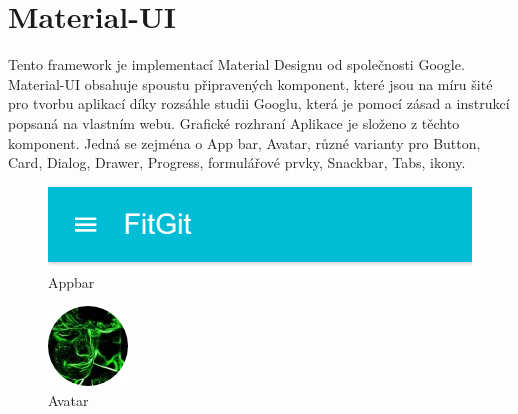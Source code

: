 \section{Material-UI}

Tento framework je implementací Material Designu od společnosti Google. Material-UI obsahuje spoustu připravených komponent, které jsou na míru šité pro tvorbu aplikací díky rozsáhle studii Googlu, která je pomocí zásad a instrukcí popsaná na vlastním webu. Grafické rozhraní Aplikace je složeno z těchto komponent. Jedná se zejména o App bar, Avatar, různé varianty pro Button, Card, Dialog, Drawer, Progress, formulářové prvky, Snackbar, Tabs, ikony.

\begin{figure}[ht]
	\centering
	\includegraphics[scale=0.5]{sections/ui/images/Appbar.png}
	\caption{Appbar}
\end{figure}

\begin{figure}[ht]
	\centering
	\includegraphics[scale=0.5]{sections/ui/images/Avatar.png}
	\caption{Avatar}
\end{figure}

